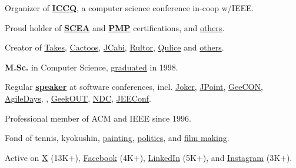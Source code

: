 \documentclass{yb}
\begin{document}
    Organizer of \href{https://www.iccq.ru}{\textbf{ICCQ}}, a computer science conference in-coop w/IEEE.

    Proud holder of \textbf{\href{https://github.com/yegor256/blog/blob/master/pdf/certifications/OCMJEA-Feb11.pdf}{SCEA}} and
    \textbf{\href{https://github.com/yegor256/blog/blob/master/pdf/certifications/PMP-Jun07.pdf}{PMP}} certifications,
    and \href{https://github.com/yegor256/blog/tree/master/pdf/certifications}{others}.

    Creator of \href{https://www.takes.org}{Takes},
    \href{https://www.cactoos.org}{Cactoos},
    \href{https://www.jcabi.com}{JCabi},
    \href{https://www.rultor.com}{Rultor},
    \href{https://www.qulice.com}{Qulice} and
    \href{https://www.yegor256.com/pets.html}{others}.

    \textbf{M.Sc.} in Computer Science,
    \href{https://en.wikipedia.org/wiki/Oles_Honchar_Dnipro_National_University}{graduated} in 1998.

    Regular \textbf{\href{https://www.yegor256.com/talks.html}{speaker}}
    at software conferences, incl.
    \href{https://youtu.be/55mwAbuDrV8}{Joker},
    \href{https://www.youtube.com/watch?v=20QBvrHq6TA}{JPoint},
    \href{https://vimeo.com/177215750}{GeeCON},
    \href{https://www.youtube.com/watch?v=TLM9eN0b6zo}{AgileDays},
    \href{https://www.youtube.com/watch?v=03PXmPc7Q3g}{},
    \href{https://www.youtube.com/watch?v=7yTIWFZrXpg}{GeekOUT},
    \href{https://www.youtube.com/watch?v=vU_x6oK437I}{NDC},
    \href{https://www.youtube.com/watch?v=GS45LzE3LPQ}{JEEConf}.

    Professional member of ACM and IEEE since 1996.

    Fond of
    tennis,
    kyokushin,
    \href{https://www.yegor256.com/paintings.html}{painting},
    \href{https://ru.yegor256.com}{politics},
    and
    \href{https://www.imdb.com/name/nm15660607}{film making}.

    Active on
    \href{https://twitter.com/intent/follow?screen_name=yegor256}{X} (13K+),
    \href{https://www.facebook.com/yegor256}{Facebook} (4K+),
    \href{https://www.linkedin.com/in/yegor256}{LinkedIn} (5K+),
    and
    \href{https://instagram.com/yegor256}{Instagram} (3K+).
\end{document}

